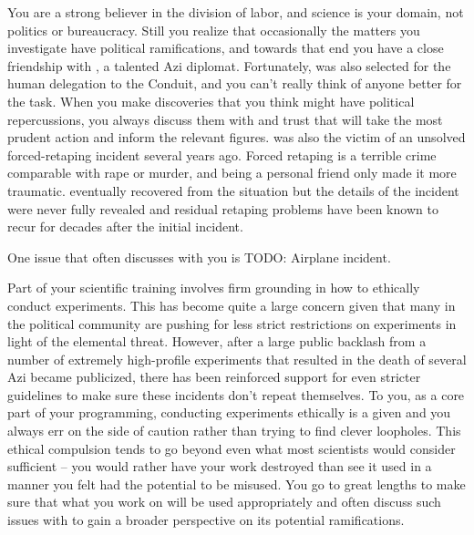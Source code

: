 \documentclass[char]{elementals}
\begin{document}
You are a strong believer in the division of labor, and science is your domain, not politics or bureaucracy. Still you realize that occasionally the matters you investigate have political ramifications, and towards that end you have a close friendship with \cDiplomat{\intro}, a talented Azi diplomat. Fortunately, \cDiplomat{} was also selected for the human delegation to the Conduit, and you can't really think of anyone better for the task. When you make discoveries that you think might have political repercussions, you always discuss them with \cDiplomat{} and trust that \cDiplomat{\they} will take the most prudent action and inform the relevant figures. \cDiplomat{} was also the victim of an unsolved forced-retaping incident several years ago. Forced retaping is a terrible crime comparable with rape or murder, and \cDiplomat{} being a personal friend only made it more traumatic. \cDiplomat{} eventually recovered from the situation but the details of the incident were never fully revealed and residual retaping problems have been known to recur for decades after the initial incident.

One issue that \cDiplomat{} often discusses with you is
TODO: Airplane incident.

Part of your scientific training involves firm grounding in how to ethically conduct experiments. This has become quite a large concern given that many in the political community are pushing for less strict restrictions on experiments in light of the elemental threat. However, after a large public backlash from a number of extremely high-profile experiments that resulted in the death of several Azi became publicized, there has been reinforced support for even stricter guidelines to make sure these incidents don't repeat themselves. To you, as a core part of your programming, conducting experiments ethically is a given and you always err on the side of caution rather than trying to find clever loopholes. This ethical compulsion tends to go beyond even what most scientists would consider sufficient -- you would rather have your work destroyed than see it used in a manner you felt had the potential to be misused. You go to great lengths to make sure that what you work on will be used appropriately and often discuss such issues with \cDiplomat{} to gain a broader perspective on its potential ramifications.
\end{document}
